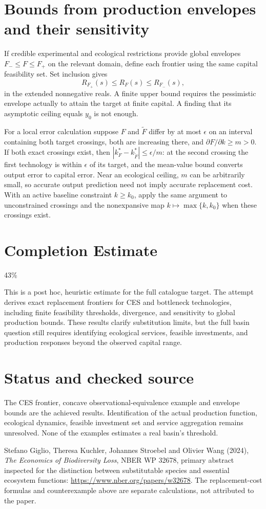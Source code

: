 \documentclass[11pt]{article}
\begin{document}
\section{Bounds from production envelopes and their sensitivity}
If credible experimental and ecological restrictions provide global envelopes $F_-\leq F\leq F_+$ on the relevant domain, define each frontier using the same capital feasibility set. Set inclusion gives
\[
 R_{F_+}(s)\leq R_F(s)\leq R_{F_-}(s),
\]
in the extended nonnegative reals. A finite upper bound requires the pessimistic envelope actually to attain the target at finite capital. A finding that its asymptotic ceiling equals $y_0$ is not enough.

For a local error calculation suppose $F$ and $\widetilde F$ differ by at most $\epsilon$ on an interval containing both target crossings, both are increasing there, and $\partial F/\partial k\geq m>0$. If both exact crossings exist, then $|k^*_{F}-k^*_{\widetilde F}|\leq\epsilon/m$: at the second crossing the first technology is within $\epsilon$ of its target, and the mean-value bound converts output error to capital error. Near an ecological ceiling, $m$ can be arbitrarily small, so accurate output prediction need not imply accurate replacement cost. With an active baseline constraint $k\geq k_0$, apply the same argument to unconstrained crossings and the nonexpansive map $k\mapsto\max\{k,k_0\}$ when these crossings exist.

\section{Completion Estimate}
43\%

This is a post hoc, heuristic estimate for the full catalogue target.
The attempt derives exact replacement frontiers for CES and bottleneck technologies, including finite feasibility thresholds, divergence, and sensitivity to global production bounds. These results clarify substitution limits, but the full basin question still requires identifying ecological services, feasible investments, and production responses beyond the observed capital range.

\section{Status and checked source}
The CES frontier, concave observational-equivalence example and envelope bounds are the achieved results. Identification of the actual production function, ecological dynamics, feasible investment set and service aggregation remains unresolved. None of the examples estimates a real basin's threshold.

Stefano Giglio, Theresa Kuchler, Johannes Stroebel and Olivier Wang (2024), \emph{The Economics of Biodiversity Loss}, NBER WP 32678, primary abstract inspected for the distinction between substitutable species and essential ecosystem functions:
\url{https://www.nber.org/papers/w32678}. The replacement-cost formulas and counterexample above are separate calculations, not attributed to the paper.
\end{document}

